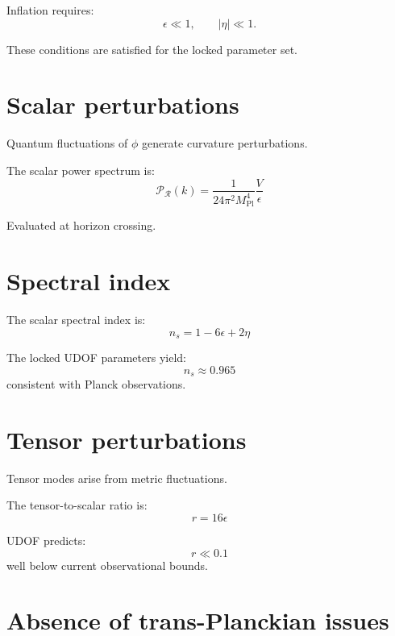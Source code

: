\documentclass[11pt]{book}
\newcommand{\mpl}{M_{\mathrm{Pl}}}
\begin{document}
Inflation requires:
\begin{equation}
\epsilon \ll 1,
\qquad
|\eta| \ll 1.
\end{equation}

These conditions are satisfied for the locked parameter set.

\section{Scalar perturbations}

Quantum fluctuations of $\phi$ generate curvature perturbations.

The scalar power spectrum is:
\begin{equation}
\mathcal{P}_\mathcal{R}(k)
=
\frac{1}{24\pi^2 \mpl^4}
\frac{V}{\epsilon}
\end{equation}

Evaluated at horizon crossing.

\section{Spectral index}

The scalar spectral index is:
\begin{equation}
n_s = 1 - 6\epsilon + 2\eta
\end{equation}

The locked UDOF parameters yield:
\begin{equation}
n_s \approx 0.965
\end{equation}
consistent with Planck observations.

\section{Tensor perturbations}

Tensor modes arise from metric fluctuations.

The tensor-to-scalar ratio is:
\begin{equation}
r = 16\epsilon
\end{equation}

UDOF predicts:
\begin{equation}
r \ll 0.1
\end{equation}
well below current observational bounds.

\section{Absence of trans-Planckian issues}
\end{document}
